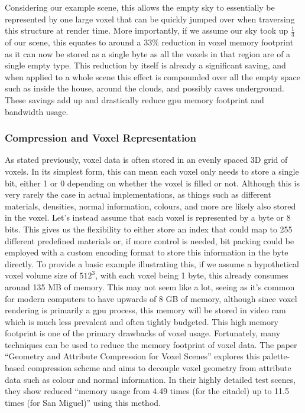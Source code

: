 \documentclass[titlepage]{article}
\begin{document}
Considering our example scene, this allows the empty sky to essentially be represented by one large voxel that can be quickly jumped over when traversing this structure at render time. More importantly, if we assume our sky took up $\frac{1}{3}$ of our scene, this equates to around a 33\% reduction in voxel memory footprint as it can now be stored as a single byte as all the voxels in that region are of a single empty type. This reduction by itself is already a significant saving, and when applied to a whole scene this effect is compounded over all the empty space such as inside the house, around the clouds, and possibly caves underground. These savings add up and drastically reduce \gls{gpu} memory footprint and bandwidth usage.

\subsubsection{Compression and Voxel Representation}
As stated previously, voxel data is often stored in an evenly spaced 3D grid of voxels. In its simplest form, this can mean each voxel only needs to store a single bit, either 1 or 0 depending on whether the voxel is filled or not. Although this is very rarely the case in actual implementations, as things such as different materials, densities, normal information, colours, and more are likely also stored in the voxel. Let's instead assume that each voxel is represented by a byte or 8 bits. This gives us the flexibility to either store an index that could map to 255 different predefined materials or, if more control is needed, bit packing could be employed with a custom encoding format to store this information in the byte directly. To provide a basic example illustrating this, if we assume a hypothetical voxel volume size of $512^3$, with each voxel being 1 byte, this already consumes around 135 MB of memory. This may not seem like a lot, seeing as it's common for modern computers to have upwards of 8 GB of memory, although since voxel rendering is primarily a \gls{gpu} process, this memory will be stored in video \gls{ram} which is much less prevalent and often tightly budgeted. This high memory footprint is one of the primary drawbacks of voxel usage. Fortunately, many techniques can be used to reduce the memory footprint of voxel data. The paper ``Geometry and Attribute Compression for Voxel Scenes'' \cite{compression} explores this palette-based compression scheme and aims to decouple voxel geometry from attribute data such as colour and normal information. In their highly detailed test scenes, they show reduced ``memory usage from 4.49 times (for the citadel) up to 11.5 times (for San Miguel)'' using this method.
\end{document}
